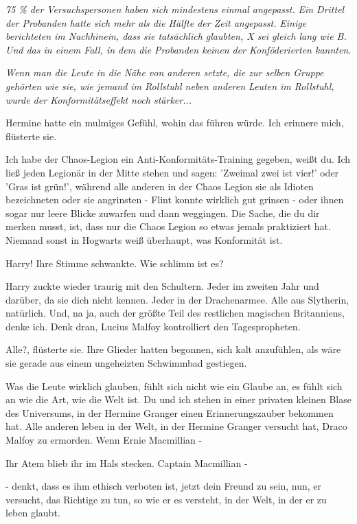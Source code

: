 \emph{75 \% der Versuchspersonen haben sich mindestens einmal \glqq{}
angepasst\grqq{}.} \emph{Ein Drittel der Probanden hatte sich mehr als die
Hälfte der Zeit angepasst.} \emph{Einige berichteten im Nachhinein, dass sie
tatsächlich glaubten, X sei gleich lang wie B. Und das in einem Fall, in dem die
Probanden keinen der Konföderierten kannten.}

\emph{Wenn man die Leute in die Nähe von anderen setzte, die zur selben Gruppe
gehörten wie sie, wie jemand im Rollstuhl neben anderen Leuten im Rollstuhl,
wurde der Konformitätseffekt noch stärker...}

Hermine hatte ein mulmiges Gefühl, wohin das führen würde. \glqq{}Ich erinnere
mich\grqq{}, flüsterte sie.

\glqq{}Ich habe der Chaos-Legion ein Anti-Konformitäts-Training gegeben, weißt
du. Ich ließ jeden Legionär in der Mitte stehen und sagen: 'Zweimal zwei ist
vier!' oder 'Gras ist grün!', während alle anderen in der Chaos Legion sie als
Idioten bezeichneten oder sie angrinsten - Flint konnte wirklich gut grinsen -
oder ihnen sogar nur leere Blicke zuwarfen und dann weggingen. Die Sache, die du
dir merken musst, ist, dass nur die Chaos Legion so etwas jemals praktiziert
hat. Niemand sonst in Hogwarts weiß überhaupt, was Konformität ist.\grqq{}

\glqq{}Harry!\grqq{} Ihre Stimme schwankte. \glqq{}Wie schlimm ist es?\grqq{}

Harry zuckte wieder traurig mit den Schultern. \glqq{}Jeder im zweiten Jahr und
darüber, da sie dich nicht kennen. Jeder in der Drachenarmee. Alle aus
Slytherin, natürlich. Und, na ja, auch der größte Teil des restlichen magischen
Britanniens, denke ich. Denk dran, Lucius Malfoy kontrolliert den
Tagespropheten.\grqq{}

\glqq{}Alle?\grqq{}, flüsterte sie. Ihre Glieder hatten begonnen, sich kalt
anzufühlen, als wäre sie gerade aus einem ungeheizten Schwimmbad gestiegen.

\glqq{}Was die Leute wirklich glauben, fühlt sich nicht wie ein Glaube an, es
fühlt sich an wie die Art, wie die Welt ist. Du und ich stehen in einer privaten
kleinen Blase des Universums, in der Hermine Granger einen Erinnerungszauber
bekommen hat. Alle anderen leben in der Welt, in der Hermine Granger versucht
hat, Draco Malfoy zu ermorden. Wenn Ernie Macmillian -\grqq{}

Ihr Atem blieb ihr im Hals stecken. Captain Macmillian -

\glqq{}- denkt, dass es ihm ethisch verboten ist, jetzt dein Freund zu sein, nun,
er versucht, das Richtige zu tun, so wie er es versteht, in der Welt, in der er
zu leben glaubt.\grqq{}

